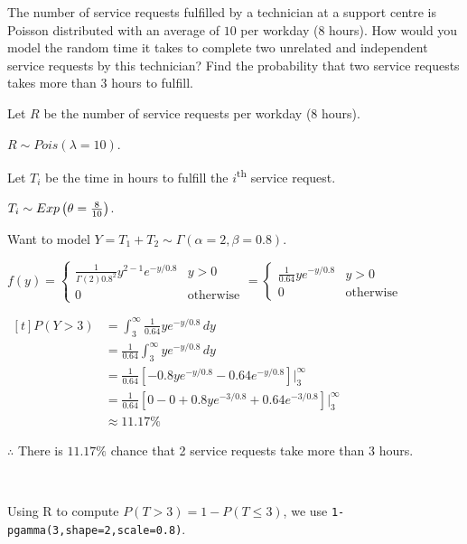 \begin{example}
    The number of service requests fulfilled by a technician at a support centre is Poisson distributed with an average of $10$ per workday (8 hours). How would you model the random time it takes to complete two unrelated and independent service requests by this technician? Find the probability that two service requests takes more than $3$ hours to fulfill.

    Let $R$ be the number of service requests per workday (8 hours). 

    $R \sim Pois(\lambda = 10)$. 

    Let $T_i$ be the time in hours to fulfill the $i$\textsuperscript{th} service request. 

    $T_i \sim Exp\left(\theta = \frac{8}{10}\right)$. 

    Want to model $Y = T_1 + T_2 \sim \Gamma(\alpha = 2, \beta = 0.8)$. 

    $f(y) = \begin{cases} \frac{1}{\Gamma(2) 0.8^2} y^{2-1} e^{-y/0.8} & y > 0 \\ 0 & \text{otherwise} \end{cases} = \begin{cases} \frac{1}{0.64} y e^{-y/0.8} & y > 0 \\ 0 & \text{otherwise} \end{cases}$

    $\begin{aligned}[t]
        P(Y > 3) & = \int_3^\infty \frac{1}{0.64} y e^{-y/0.8} \,dy                                          \\
                 & = \frac{1}{0.64} \int_3^\infty y e^{-y/0.8} \,dy                                          \\
                 & = \frac{1}{0.64} \left[ -0.8y e^{-y/0.8} - 0.64 e^{-y/0.8} \right] \bigg|_3^\infty        \\
                 & = \frac{1}{0.64} \left[ 0 - 0 + 0.8y e^{-3/0.8} + 0.64 e^{-3/0.8} \right] \bigg|_3^\infty \\
                 & \approx 11.17\%
    \end{aligned}$

    $\therefore$ There is $11.17\%$ chance that 2 service requests take more than 3 hours. 

    {~~~}

    Using R to compute $P(T > 3) = 1 - P(T \le 3)$, we use \texttt{1-pgamma(3,shape=2,scale=0.8)}. 
\end{example}

